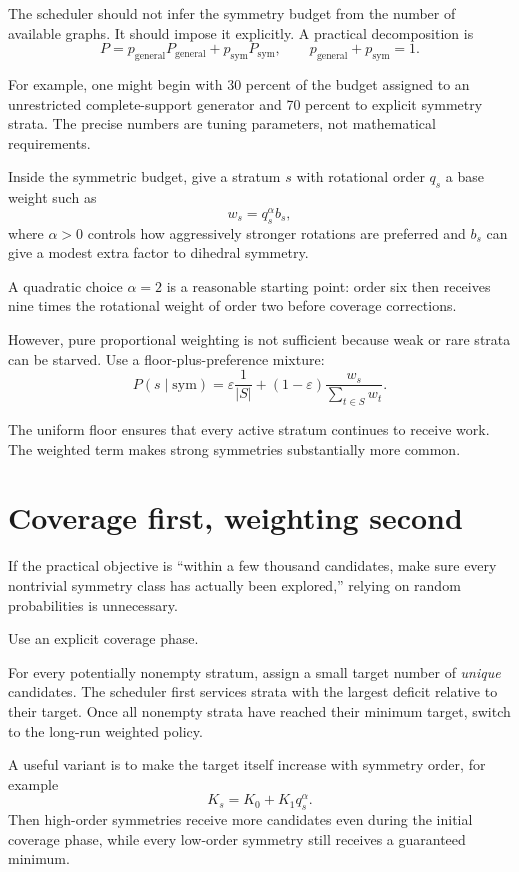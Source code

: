 \documentclass[11pt]{article}
\begin{document}
The scheduler should not infer the symmetry budget from the number of available graphs. It should impose it explicitly. A practical decomposition is
\[
P = p_{\mathrm{general}} P_{\mathrm{general}} + p_{\mathrm{sym}} P_{\mathrm{sym}},
\qquad p_{\mathrm{general}}+p_{\mathrm{sym}}=1.
\]

For example, one might begin with 30 percent of the budget assigned to an unrestricted complete-support generator and 70 percent to explicit symmetry strata. The precise numbers are tuning parameters, not mathematical requirements.

Inside the symmetric budget, give a stratum \(s\) with rotational order \(q_s\) a base weight such as
\[
w_s = q_s^{\alpha} b_s,
\]
where \(\alpha>0\) controls how aggressively stronger rotations are preferred and \(b_s\) can give a modest extra factor to dihedral symmetry.

A quadratic choice \(\alpha=2\) is a reasonable starting point: order six then receives nine times the rotational weight of order two before coverage corrections.

However, pure proportional weighting is not sufficient because weak or rare strata can be starved. Use a floor-plus-preference mixture:
\[
P(s\mid\mathrm{sym}) =
\varepsilon\frac{1}{|S|}
+(1-\varepsilon)\frac{w_s}{\sum_{t\in S}w_t}.
\]

The uniform floor ensures that every active stratum continues to receive work. The weighted term makes strong symmetries substantially more common.

\section{Coverage first, weighting second}

If the practical objective is ``within a few thousand candidates, make sure every nontrivial symmetry class has actually been explored,'' relying on random probabilities is unnecessary.

Use an explicit coverage phase.

For every potentially nonempty stratum, assign a small target number of \emph{unique} candidates. The scheduler first services strata with the largest deficit relative to their target. Once all nonempty strata have reached their minimum target, switch to the long-run weighted policy.

A useful variant is to make the target itself increase with symmetry order, for example
\[
K_s = K_0 + K_1 q_s^{\alpha}.
\]
Then high-order symmetries receive more candidates even during the initial coverage phase, while every low-order symmetry still receives a guaranteed minimum.
\end{document}
